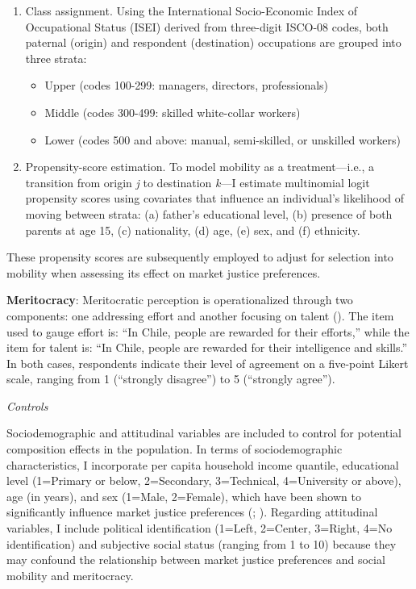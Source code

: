 \documentclass[
  13pt,
]{article}
\providecommand{\tightlist}{%
  \setlength{\itemsep}{0pt}\setlength{\parskip}{0pt}}\usepackage{longtable,booktabs,array}
\begin{document}
\begin{enumerate}
\def\labelenumi{\arabic{enumi}.}
\item
  Class assignment. Using the International Socio-Economic Index of
  Occupational Status (ISEI) derived from three-digit ISCO-08 codes,
  both paternal (origin) and respondent (destination) occupations are
  grouped into three strata:

  \begin{itemize}
  \tightlist
  \item
    Upper (codes 100-299: managers, directors, professionals)
  \item
    Middle (codes 300-499: skilled white-collar workers)
  \item
    Lower (codes 500 and above: manual, semi-skilled, or unskilled
    workers)
  \end{itemize}
\item
  Propensity-score estimation. To model mobility as a treatment---i.e.,
  a transition from origin \emph{j} to destination \emph{k}---I estimate
  multinomial logit propensity scores using covariates that influence an
  individual's likelihood of moving between strata: (a) father's
  educational level, (b) presence of both parents at age 15, (c)
  nationality, (d) age, (e) sex, and (f) ethnicity.
\end{enumerate}

These propensity scores are subsequently employed to adjust for
selection into mobility when assessing its effect on market justice
preferences.

\textbf{Meritocracy}: Meritocratic perception is operationalized through
two components: one addressing effort and another focusing on talent
(). The item used to gauge
effort is: ``In Chile, people are rewarded for their efforts,'' while
the item for talent is: ``In Chile, people are rewarded for their
intelligence and skills.'' In both cases, respondents indicate their
level of agreement on a five-point Likert scale, ranging from 1
(``strongly disagree'') to 5 (``strongly agree'').

\emph{Controls}

Sociodemographic and attitudinal variables are included to control for
potential composition effects in the population. In terms of
sociodemographic characteristics, I incorporate per capita household
income quantile, educational level (1=Primary or below, 2=Secondary,
3=Technical, 4=University or above), age (in years), and sex (1=Male,
2=Female), which have been shown to significantly influence market
justice preferences (; ). Regarding
attitudinal variables, I include political identification (1=Left,
2=Center, 3=Right, 4=No identification) and subjective social status
(ranging from 1 to 10) because they may confound the relationship
between market justice preferences and social mobility and meritocracy.
\end{document}
